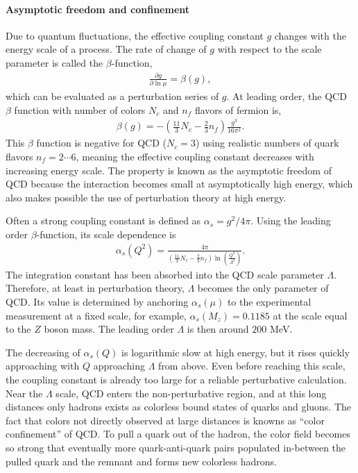 \paragraph{Asymptotic freedom and confinement}
Due to quantum fluctuations, the effective coupling constant $g$ changes with the energy scale of a process. 
The rate of change of $g$ with respect to the scale parameter is called the $\beta$-function,
\begin{eqnarray}
\frac{\partial g}{\partial \ln\mu} = \beta(g),
\end{eqnarray}
which can be evaluated as a perturbation series of $g$.
At leading order, the QCD $\beta$ function with number of colors $N_c$ and $n_f$ flavors of fermion is,
\begin{eqnarray}
\beta(g) = - \left( \frac{11}{3}N_c - \frac{2}{3}n_f \right) \frac{g^3}{16\pi^2}.
\end{eqnarray}
This $\beta$ function is negative for QCD ($N_c=3$) using realistic numbers of quark flavors $n_f = 2\cdots 6$, meaning the effective coupling constant decreases with increasing energy scale.
The property is known as the asymptotic freedom of QCD because the interaction becomes small at asymptotically high energy, which also makes possible the use of perturbation theory at high energy.

Often a strong coupling constant is defined as $\alpha_s = g^2/4\pi$.
Using the leading order $\beta$-function, its scale dependence is
\begin{eqnarray}
    \alpha_s(Q^2) = \frac{4\pi}{\left(\frac{11}{3}N_c - \frac{2}{3}n_f\right)\ln\left(\frac{Q^2}{\Lambda^2}\right)}.
\end{eqnarray}
The integration constant has been absorbed into the QCD scale parameter $\Lambda$.
Therefore, at least in perturbation theory, $\Lambda$ becomes the only parameter of QCD. 
Its value is determined by anchoring $\alpha_s(\mu)$ to the experimental measurement at a fixed scale, for example, $\alpha_s(M_z) = 0.1185$ at the scale equal to the $Z$ boson mass.
The leading order $\Lambda$ is then around $200$ MeV.

The decreasing of $\alpha_s(Q)$ is logarithmic slow at high energy, but it rises quickly approaching with $Q$ approaching $\Lambda$ from above.
Even before reaching this scale, the coupling constant is already too large for a reliable perturbative calculation.
Near the $\Lambda$ scale, QCD enters the non-perturbative region,
and at this long distances only hadrons exists as colorless bound states of quarks and gluons.
The fact that colors not directly observed at large distances is knowns as ``color confinement'' of QCD. 
To pull a quark out of the hadron, the color field becomes so strong that eventually more quark-anti-quark pairs populated in-between the pulled quark and the remnant and forms new colorless hadrons.

